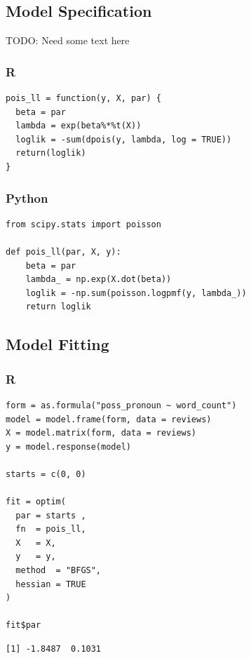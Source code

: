 \documentclass[
  letterpaper,
]{krantz}
\begin{document}
\subsection{Model Specification}\label{sec-glm-poisson-spec}

TODO: Need some text here

\subsubsection{R}

\begin{verbatim}
pois_ll = function(y, X, par) {
  beta = par
  lambda = exp(beta%*%t(X))
  loglik = -sum(dpois(y, lambda, log = TRUE))
  return(loglik)
}
\end{verbatim}

\subsubsection{Python}

\begin{verbatim}
from scipy.stats import poisson

def pois_ll(par, X, y):
    beta = par
    lambda_ = np.exp(X.dot(beta))
    loglik = -np.sum(poisson.logpmf(y, lambda_))
    return loglik
\end{verbatim}

\subsection{Model Fitting}\label{sec-glm-poisson-fitting}

\subsubsection{R}

\begin{verbatim}
form = as.formula("poss_pronoun ~ word_count")
model = model.frame(form, data = reviews)
X = model.matrix(form, data = reviews)
y = model.response(model)

starts = c(0, 0)

fit = optim(
  par = starts ,
  fn  = pois_ll,
  X   = X,
  y   = y,
  method  = "BFGS",
  hessian = TRUE
)

fit$par
\end{verbatim}

\begin{verbatim}
[1] -1.8487  0.1031
\end{verbatim}
\end{document}
